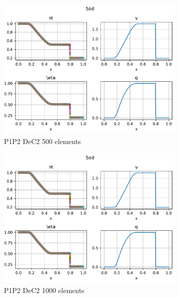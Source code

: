\documentclass[english]{article}
\theoremstyle{thmstyleone}
\theoremstyle{thmstyletwo}
\theoremstyle{thmstylethree}
\begin{document}
\begin{figure}
{\begin{minipage}{\textwidth}
\begin{subfigure}{0.45\textwidth}
				\includegraphics[trim= 0 180 0 0, clip,width=\textwidth]{figures/sod/P1P2_DeC_N_el00500.pdf}
				\caption{P1P2 DeC2 500 elements}
			\end{subfigure}
			\begin{subfigure}{0.45\textwidth}
				\includegraphics[trim= 0 180 0 0, clip,width=\textwidth]{figures/sod/P1P2_DeC_N_el01000.pdf}
				\caption{P1P2 DeC2 1000 elements}
			\end{subfigure}\\
			\vspace{2.em}
			\begin{subfigure}{0.45\textwidth}

\end{subfigure}
\end{minipage}}
\end{figure}
\end{document}
